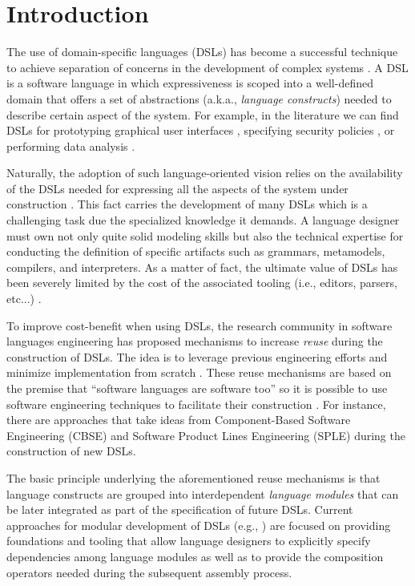 \section{Introduction}
\label{sec:introduction}

The use of domain-specific languages (DSLs) has become a successful technique to achieve separation of concerns in the development of complex systems \cite{Cook:2006}. A DSL is a software language in which expressiveness is scoped into a well-defined domain that offers a set of abstractions (a.k.a., \textit{language constructs}) needed to describe certain aspect of the system. For example, in the literature we can find DSLs for prototyping graphical user interfaces \cite{Oney:2012}, specifying security policies \cite{Lodderstedt:2002}, or performing data analysis \cite{Eberius:2012}.

Naturally, the adoption of such language-oriented vision relies on the availability of the DSLs needed for expressing all the aspects of the system under construction \cite{Clark:2013}. This fact carries the development of many DSLs which is a challenging task due the specialized knowledge it demands. A language designer must own not only quite solid modeling skills but also the technical expertise for conducting the definition of specific artifacts such as grammars, metamodels, compilers, and interpreters. As a matter of fact, the ultimate value of DSLs has been severely limited by the cost of the associated tooling (i.e., editors, parsers, etc...) \cite{jezequel:2014}.

To improve cost-benefit when using DSLs, the research community in software languages engineering has proposed mechanisms to increase \textit{reuse} during the construction of DSLs. The idea is to leverage previous engineering efforts and minimize implementation from scratch \cite{Storm:2013}. These reuse mechanisms are based on the premise that ``software languages are software too'' \cite{Favre:2011} so it is possible to use software engineering techniques to facilitate their construction \cite{Kleppe:2009}. For instance, there are approaches that take ideas from Component-Based Software Engineering (CBSE) \cite{Cleenewerck:2003} and Software Product Lines Engineering (SPLE) \cite{Zschaler:2010} during the construction of new DSLs.

The basic principle underlying the aforementioned reuse mechanisms is that language constructs are grouped into interdependent \textit{language modules} that can be later integrated as part of the specification of future DSLs. Current approaches for modular development of DSLs (e.g., \cite{Vacchi:2015,Mernik:2013,Rumpe:2010}) are focused on providing foundations and tooling that allow language designers to explicitly specify dependencies among language modules as well as to provide the composition operators needed during the subsequent assembly process.

